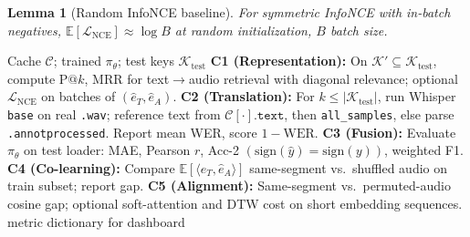 \documentclass[12pt,a4paper]{article}
\theoremstyle{definition}
\theoremstyle{plain}
\newtheorem{lemma}[theorem]{Lemma}
\theoremstyle{remark}
\begin{document}
\begin{lemma}[Random InfoNCE baseline]
For symmetric InfoNCE with in-batch negatives, $\mathbb{E}[\mathcal{L}_{\mathrm{NCE}}] \approx \log B$ at random initialization, $B$ batch size.
\end{lemma}

\begin{algorithm}[H]
\caption{Challenge suite C1--C5 + fusion metrics (test split, notebook)}
\label{alg:pipeline_e_challenges}
\begin{algorithmic}[1]
\Require Cache $\mathcal{C}$; trained $\pi_\theta$; test keys $\mathcal{K}_{\text{test}}$
\State \textbf{C1 (Representation):} On $\mathcal{K}' \subseteq \mathcal{K}_{\text{test}}$, compute $\mathrm{P@}k$, MRR for text$\to$audio retrieval with diagonal relevance; optional $\mathcal{L}_{\mathrm{NCE}}$ on batches of $(\hat{e}_T,\hat{e}_A)$.
\State \textbf{C2 (Translation):} For $k \leq |\mathcal{K}_{\text{test}}|$, run Whisper \texttt{base} on real \texttt{.wav}; reference text from $\mathcal{C}[\cdot].\texttt{text}$, then \texttt{all\_samples}, else parse \texttt{.annotprocessed}. Report mean WER, score $1-\mathrm{WER}$.
\State \textbf{C3 (Fusion):} Evaluate $\pi_\theta$ on test loader: MAE, Pearson $r$, Acc-2 $(\mathrm{sign}(\hat{y})=\mathrm{sign}(y))$, weighted F1.
\State \textbf{C4 (Co-learning):} Compare $\mathbb{E}[\langle \hat{e}_T,\hat{e}_A\rangle]$ same-segment vs.\ shuffled audio on train subset; report gap.
\State \textbf{C5 (Alignment):} Same-segment vs.\ permuted-audio cosine gap; optional soft-attention and DTW cost on short embedding sequences.
\State \Return metric dictionary for dashboard
\end{algorithmic}
\end{algorithm}
\end{document}
